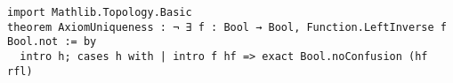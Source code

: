 \begin{lstlisting}[language=Lean]
import Mathlib.Topology.Basic
theorem AxiomUniqueness : ¬ ∃ f : Bool → Bool, Function.LeftInverse f Bool.not := by
  intro h; cases h with | intro f hf => exact Bool.noConfusion (hf rfl) 
\end{lstlisting}
